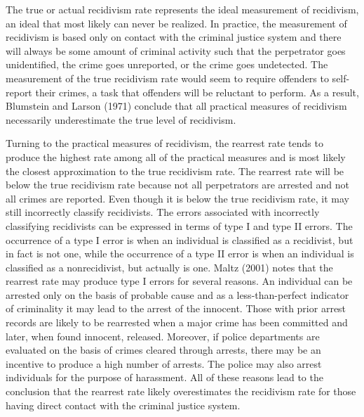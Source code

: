 The true or actual recidivism rate represents the ideal measurement of recidivism, an ideal that most likely can never be realized. In practice, the measurement of recidivism is based only on contact with the criminal justice system and there will always be some amount of criminal activity such that the perpetrator goes unidentified, the crime goes unreported, or the crime goes undetected.   The measurement of the true recidivism rate would seem to require offenders to self-report their crimes, a task that offenders will be reluctant to perform.  As a result, Blumstein and Larson (1971) conclude that all practical measures of recidivism necessarily underestimate the true level of recidivism.

Turning to the practical measures of recidivism, the rearrest rate tends to produce the highest rate among all of the practical measures and is most likely the closest approximation to the true recidivism rate. The rearrest rate will be below the true recidivism rate because not all perpetrators are arrested and not all crimes are reported.  Even though it is below the true recidivism rate, it may still incorrectly classify recidivists.  The errors associated with incorrectly classifying recidivists can be expressed in terms of type I and type II errors. The occurrence of a type I error is when an individual is classified as a recidivist, but in fact is not one, while the occurrence of a type II error is when an individual is classified as a nonrecidivist, but actually is one.  Maltz (2001) notes that the rearrest rate may produce type I errors for several reasons.  An individual can be arrested only on the basis of probable cause and as a less-than-perfect indicator of criminality it may lead to the arrest of the innocent.  Those with prior arrest records are likely to be rearrested when a major crime has been committed and later, when found innocent, released.  Moreover, if police departments are evaluated on the basis of crimes cleared through arrests, there may be an incentive to produce a high number of arrests. The police may also arrest individuals for the purpose of harassment.  All of these reasons lead to the conclusion that the rearrest rate likely overestimates the recidivism rate for those having direct contact with the criminal justice system.

